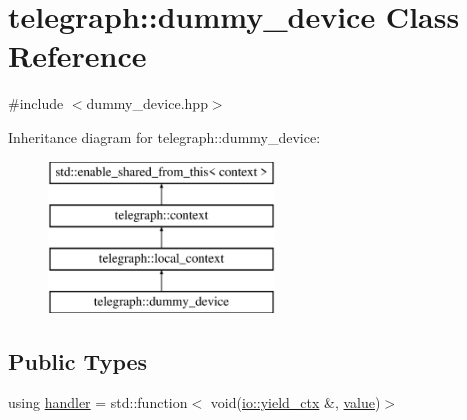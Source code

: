 \hypertarget{classtelegraph_1_1dummy__device}{}\section{telegraph\+:\+:dummy\+\_\+device Class Reference}
\label{classtelegraph_1_1dummy__device}


{\ttfamily \#include $<$dummy\+\_\+device.\+hpp$>$}

Inheritance diagram for telegraph\+:\+:dummy\+\_\+device\+:\begin{figure}[H]
\begin{center}
\leavevmode
\includegraphics[height=4.000000cm]{classtelegraph_1_1dummy__device}
\end{center}
\end{figure}
\subsection*{Public Types}
\begin{DoxyCompactItemize}
\item 
using \hyperlink{classtelegraph_1_1dummy__device_a608031386eb0abf2fc578211c1270f89}{handler} = std\+::function$<$ void(\hyperlink{structboost_1_1asio_1_1yield__ctx}{io\+::yield\+\_\+ctx} \&, \hyperlink{classtelegraph_1_1value}{value})$>$
\end{DoxyCompactItemize}
